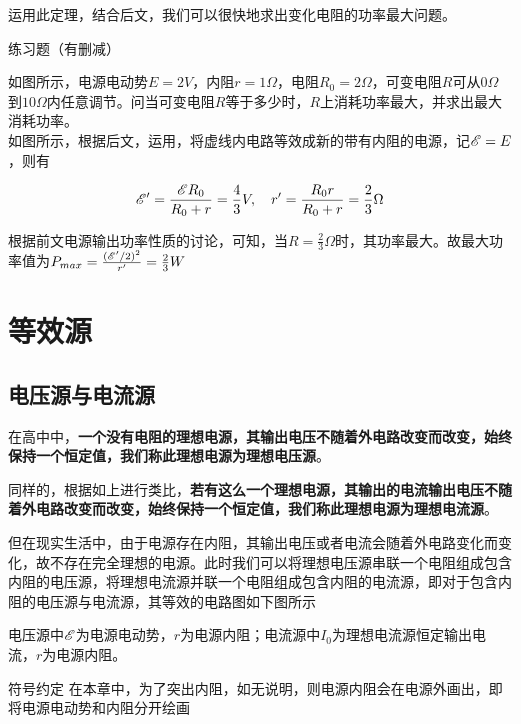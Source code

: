 运用此定理，结合后文，我们可以很快地求出变化电阻的功率最大问题。

\begin{ep}{练习题（有删减）}{}

如图所示，电源电动势$E=2V$，内阻$r=1\Omega$，电阻$R_0=2\Omega$，可变电阻$R$可从$0\Omega$到$10\Omega$内任意调节。问当可变电阻$R$等于多少时，$R$上消耗功率最大，并求出最大消耗功率。
~\\


如图所示，根据后文，运用，将虚线内电路等效成新的带有内阻的电源，记$\mathscr{E} = E$，则有

$$\mathscr{E}^{\prime} = \frac{\mathscr{E} R_0}{R_0 + r} = \frac{4}{3} V ,\quad r^{\prime} = \frac{R_0 r}{R_0 + r} = \frac{2}{3} \Omega$$

根据前文电源输出功率性质的讨论，可知，当$R=\frac{2}{3} \Omega$时，其功率最大。故最大功率值为$P_{max} = \frac{(\mathscr{E}^{\prime} / 2)^2}{r^{\prime}} = \frac{2}{3} W$

\end{ep}

\section{等效源}
\label{s_dxy}

\subsection{电压源与电流源}

在高中中，\textbf{一个没有电阻的理想电源，其输出电压不随着外电路改变而改变，始终保持一个恒定值，我们称此理想电源为理想电压源}。

同样的，根据如上进行类比，\textbf{若有这么一个理想电源，其输出的电流输出电压不随着外电路改变而改变，始终保持一个恒定值，我们称此理想电源为理想电流源}。

但在现实生活中，由于电源存在内阻，其输出电压或者电流会随着外电路变化而变化，故不存在完全理想的电源。此时我们可以将理想电压源串联一个电阻组成包含内阻的电压源，将理想电流源并联一个电阻组成包含内阻的电流源，即对于包含内阻的电压源与电流源，其等效的电路图如下图所示



电压源中$\mathscr{E}$为电源电动势，$r$为电源内阻；电流源中$I_0$为理想电流源恒定输出电流，$r$为电源内阻。

\begin{mk}{符号约定}{}
在本章中，为了突出内阻，如无说明，则电源内阻会在电源外画出，即将电源电动势和内阻分开绘画
\end{mk}

